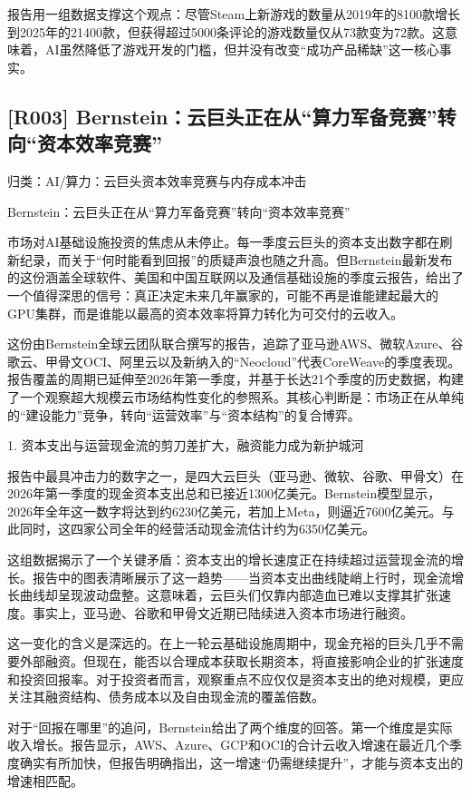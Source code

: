 \documentclass[11pt]{ctexart}
\begin{document}
报告用一组数据支撑这个观点：尽管Steam上新游戏的数量从2019年的8100款增长到2025年的21400款，但获得超过5000条评论的游戏数量仅从73款变为72款。这意味着，AI虽然降低了游戏开发的门槛，但并没有改变“成功产品稀缺”这一核心事实。

\subsection{[R003] Bernstein：云巨头正在从“算力军备竞赛”转向“资本效率竞赛”}
{\small\color{refgray}归类：AI/算力：云巨头资本效率竞赛与内存成本冲击}

Bernstein：云巨头正在从“算力军备竞赛”转向“资本效率竞赛”

市场对AI基础设施投资的焦虑从未停止。每一季度云巨头的资本支出数字都在刷新纪录，而关于“何时能看到回报”的质疑声浪也随之升高。但Bernstein最新发布的这份涵盖全球软件、美国和中国互联网以及通信基础设施的季度云报告，给出了一个值得深思的信号：真正决定未来几年赢家的，可能不再是谁能建起最大的GPU集群，而是谁能以最高的资本效率将算力转化为可交付的云收入。

这份由Bernstein全球云团队联合撰写的报告，追踪了亚马逊AWS、微软Azure、谷歌云、甲骨文OCI、阿里云以及新纳入的“Neocloud”代表CoreWeave的季度表现。报告覆盖的周期已延伸至2026年第一季度，并基于长达21个季度的历史数据，构建了一个观察超大规模云市场结构性变化的参照系。其核心判断是：市场正在从单纯的“建设能力”竞争，转向“运营效率”与“资本结构”的复合博弈。

1. 资本支出与运营现金流的剪刀差扩大，融资能力成为新护城河

报告中最具冲击力的数字之一，是四大云巨头（亚马逊、微软、谷歌、甲骨文）在2026年第一季度的现金资本支出总和已接近1300亿美元。Bernstein模型显示，2026年全年这一数字将达到约6230亿美元，若加上Meta，则逼近7600亿美元。与此同时，这四家公司全年的经营活动现金流估计约为6350亿美元。

这组数据揭示了一个关键矛盾：资本支出的增长速度正在持续超过运营现金流的增长。报告中的图表清晰展示了这一趋势——当资本支出曲线陡峭上行时，现金流增长曲线却呈现波动盘整。这意味着，云巨头们仅靠内部造血已难以支撑其扩张速度。事实上，亚马逊、谷歌和甲骨文近期已陆续进入资本市场进行融资。

这一变化的含义是深远的。在上一轮云基础设施周期中，现金充裕的巨头几乎不需要外部融资。但现在，能否以合理成本获取长期资本，将直接影响企业的扩张速度和投资回报率。对于投资者而言，观察重点不应仅仅是资本支出的绝对规模，更应关注其融资结构、债务成本以及自由现金流的覆盖倍数。

对于“回报在哪里”的追问，Bernstein给出了两个维度的回答。第一个维度是实际收入增长。报告显示，AWS、Azure、GCP和OCI的合计云收入增速在最近几个季度确实有所加快，但报告明确指出，这一增速“仍需继续提升”，才能与资本支出的增速相匹配。
\end{document}
